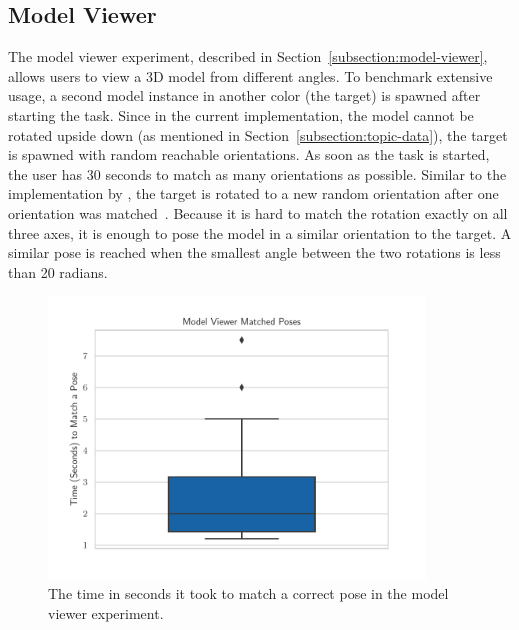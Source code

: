 \subsection{Model Viewer}\label{section:eval-res-mv}

The model viewer experiment, described in Section~\ref{subsection:model-viewer}, allows users to view a \ac{3D} model from different angles. To benchmark extensive usage, a second model instance in another color (the target) is spawned after starting the task. Since in the current implementation, the model cannot be rotated upside down (as mentioned in Section~\ref{subsection:topic-data}), the target is spawned with random reachable orientations.
As soon as the task is started, the user has 30 seconds to match as many orientations as possible. Similar to the implementation by \citeauthor{Katzakis.2010}, the target is rotated to a new random orientation after one orientation was matched~\cite[140]{Katzakis.2010}.
Because it is hard to match the rotation exactly on all three axes, it is enough to pose the model in a similar orientation to the target. A similar pose is reached when the smallest angle between the two rotations is less than 20 radians.

\begin{figure}[H]
  \centering
  \includegraphics[width=10cm]{figures/evaluation/eval_exp_mv.pdf}
  \caption[Model viewer experiment results]{The time in seconds it took to match a correct pose in the model viewer experiment.}\label{fig:eval-exp-mv}
\end{figure}

